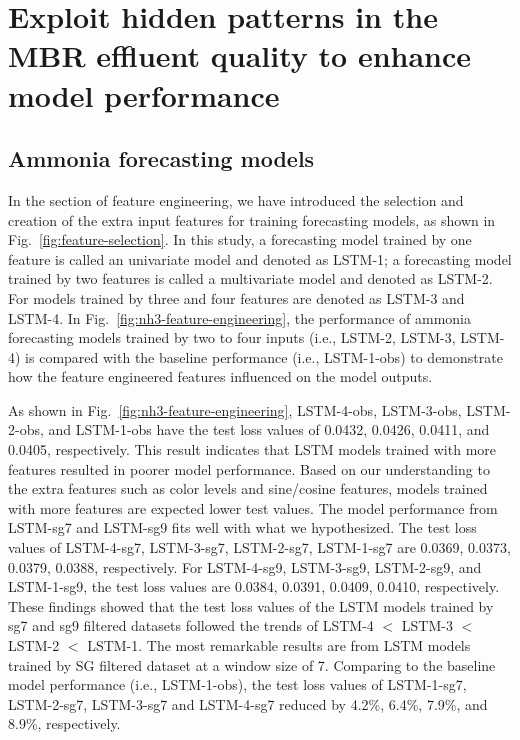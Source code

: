 \section{Exploit hidden patterns in the MBR effluent quality to enhance model performance}
\subsection{Ammonia forecasting models}
In the section of feature engineering, we have introduced the selection and creation of the extra input features for training forecasting models, as shown in Fig.~\ref{fig:feature-selection}. In this study, a forecasting model trained by one feature is called an univariate model and denoted as LSTM-1; a forecasting model trained by two features is called a multivariate model and denoted as LSTM-2. For models trained by three and four features are denoted as LSTM-3 and LSTM-4. In Fig.~\ref{fig:nh3-feature-engineering}, the performance of ammonia forecasting models trained by two to four inputs (i.e., LSTM-2, LSTM-3, LSTM-4) is compared with the baseline performance (i.e., LSTM-1-obs) to demonstrate how the feature engineered features influenced on the model outputs. 

As shown in Fig.~\ref{fig:nh3-feature-engineering}, LSTM-4-obs, LSTM-3-obs, LSTM-2-obs, and LSTM-1-obs have the test loss values of 0.0432, 0.0426, 0.0411, and 0.0405, respectively. This result indicates that LSTM models trained with more features resulted in poorer model performance. Based on our understanding to the extra features such as color levels and sine/cosine features, models trained with more features are expected lower test values. The model performance from LSTM-sg7 and LSTM-sg9 fits well with what we hypothesized. The test loss values of LSTM-4-sg7, LSTM-3-sg7, LSTM-2-sg7, LSTM-1-sg7 are 0.0369, 0.0373, 0.0379, 0.0388, respectively. For LSTM-4-sg9, LSTM-3-sg9, LSTM-2-sg9, and LSTM-1-sg9, the test loss values are 0.0384, 0.0391, 0.0409, 0.0410, respectively. These findings showed that the test loss values of the LSTM models trained by sg7 and sg9 filtered datasets followed the trends of LSTM-4 $<$ LSTM-3 $<$ LSTM-2 $<$ LSTM-1. The most remarkable results are from LSTM models trained by SG filtered dataset at a window size of 7. Comparing to the baseline model performance (i.e., LSTM-1-obs), the test loss values of LSTM-1-sg7, LSTM-2-sg7, LSTM-3-sg7 and LSTM-4-sg7 reduced by 4.2\%, 6.4\%, 7.9\%, and 8.9\%, respectively.

